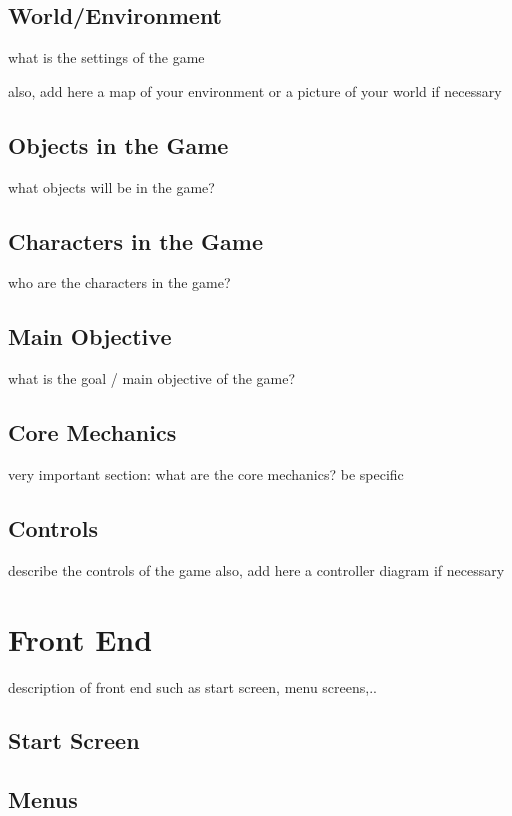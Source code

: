 \documentclass[a4paper]{scrreprt}
\begin{document}
\section{World/Environment}
what is the settings of the game 

also, add here a map of your environment or a picture of your world if necessary

\section{Objects in the Game}
what objects will be in the game?

\section{Characters in the Game}
who are the characters in the game?

\section{Main Objective}
what is the goal / main objective of the game?

\section{Core Mechanics}
very important section: what are the core mechanics? be specific

\section{Controls}
describe the controls of the game 
also, add here a controller diagram if necessary 



\chapter{Front End}
description of front end such as start screen, menu screens,..  

\section{Start Screen}

\section{Menus}
\end{document}
